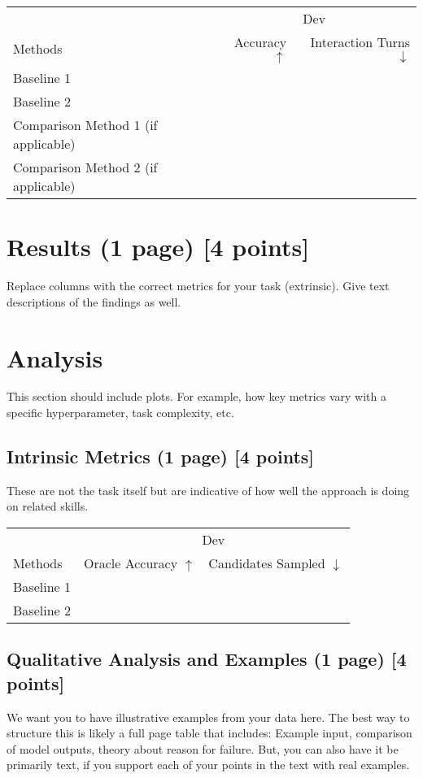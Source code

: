 \documentclass[11pt,a4paper]{article}
\begin{document}
\clearpage
\begin{table}[t]
\centering
\begin{tabular}{@{}lrr@{}}
\toprule
                            & \multicolumn{2}{c}{Dev} \\
Methods                     & Accuracy $\uparrow$ & Interaction Turns $\downarrow$  \\
\midrule
Baseline 1 \cite{} & & \\
Baseline 2 \cite{} & & \\
\midrule
Comparison Method 1 (if applicable) \cite{} & & \\
Comparison Method 2 (if applicable) \cite{} & & \\
\bottomrule
\end{tabular}
\end{table}
\section{Results (1 page) [4 points]}
Replace columns with the correct metrics for your task (extrinsic). Give text descriptions of the findings as well. 

\clearpage
\section{Analysis}
This section should include plots. For example, how key metrics vary with a specific hyperparameter, task complexity, etc.

\subsection{Intrinsic Metrics (1 page) [4 points]}
These are not the task itself but are indicative of how well the approach is doing on related skills.
\begin{table}[t]
\centering
\begin{tabular}{@{}lrr@{}}
\toprule
                            & \multicolumn{2}{c}{Dev} \\
Methods                     & Oracle Accuracy $\uparrow$ & Candidates Sampled $\downarrow$  \\
\midrule
Baseline 1 \cite{} & & \\
Baseline 2 \cite{} & & \\
\bottomrule
\end{tabular}
\end{table}

\clearpage
\subsection{Qualitative Analysis and Examples (1 page) [4 points]}
We want you to have illustrative examples from your data here. The best way to structure this is likely a full page table that includes: Example input, comparison of model outputs, theory about reason for failure. But, you can also have it be primarily text, if you support each of your points in the text with real examples.
\end{document}
